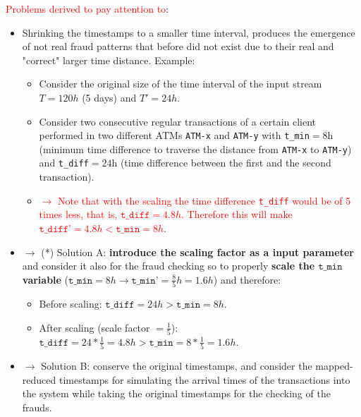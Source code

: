 \textcolor{red}{Problems derived to pay attention to}:
\begin{itemize}
  \item Shrinking the timestamps to a smaller time interval, produces the emergence of not real fraud patterns that before did not exist due to their real and "correct" larger time distance. Example:
  \begin{itemize}
  \item Consider the original size of the time interval of the input stream $T=120h$ (5 days) and $T'=24h$.
  \item Consider two consecutive regular transactions of a certain client performed in two different ATMs \texttt{ATM-x} and \texttt{ATM-y} with \texttt{t\_min}$=8$h (minimum time difference to traverse the distance from \texttt{ATM-x} to \texttt{ATM-y}) and \texttt{t\_diff}$=24$h (time difference between the first and the second transaction). 
  \item \textcolor{red}{$\rightarrow$ Note that with the scaling the time difference \texttt{t\_diff} would be of 5 times less, that is, $\texttt{t\_diff}=4.8h$. Therefore this will make $\texttt{t\_diff'}=4.8h < \texttt{t\_min}=8h$}.
  \end{itemize}
  \item $\rightarrow$ (*) Solution A: \textbf{introduce the scaling factor as a input parameter} and consider it also for the fraud checking so to properly \textbf{scale the $\texttt{t\_min}$ variable} ($\texttt{t\_min}=8h \rightarrow \texttt{t\_min'}=\frac{8}{5}h=1.6h$) and therefore: 
  \begin{itemize}
    \item Before scaling: $\texttt{t\_diff}=24h > \texttt{t\_min}=8h$.
    \item After scaling (scale factor $=\frac{1}{5}$): $\texttt{t\_diff}=24*\frac{1}{5}=4.8h > \texttt{t\_min}=8*\frac{1}{5}=1.6h$.
  \end{itemize}
  \item $\rightarrow$ Solution B: conserve the original timestamps, and consider the mapped-reduced timestamps for simulating the arrival times of the transactions into the system while taking the original timestamps for the checking of the frauds.
\end{itemize}


